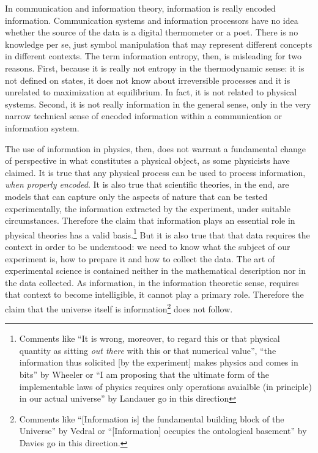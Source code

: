\documentclass[iopart]{revtex4-1}
\begin{document}
In communication and information theory, information is really encoded information. Communication systems and information processors have no idea whether the source of the data is a digital thermometer or a poet. There is no knowledge per se, just symbol manipulation that may represent different concepts in different contexts. The term information entropy, then, is misleading for two reasons. First, because it is really not entropy in the thermodynamic sense: it is not defined on states, it does not know about irreversible processes and it is unrelated to maximization at equilibrium. In fact, it is not related to physical systems. Second, it is not really information in the general sense, only in the very narrow technical sense of encoded information within a communication or information system.

The use of information in physics, then, does not warrant a fundamental change of perspective in what constitutes a physical object, as some physicists have claimed. It is true that any physical process can be used to process information, \emph{when properly encoded}. It is also true that scientific theories, in the end, are models that can capture only the aspects of nature that can be tested experimentally, the information extracted by the experiment, under suitable circumstances. Therefore the claim that information plays an essential role in physical theories has a valid basis.\footnote{Comments like ``It is wrong, moreover, to regard this or that  physical quantity as sitting \emph{out there} with this or that numerical value'', ``the information thus solicited [by the experiment] makes physics and comes in bits'' by Wheeler\cite{Wheeler} or ``I am proposing that the ultimate form of the implementable laws of physics requires only operations avaialble (in principle) in our actual universe'' by Landauer\cite{Landauer} go in this direction} But it is also true that that data requires the context in order to be understood: we need to know what the subject of our experiment is, how to prepare it and how to collect the data. The art of experimental science is contained neither in the mathematical description nor in the data collected. As information, in the information theoretic sense, requires that context to become intelligible, it cannot play a primary role. Therefore the claim that the universe itself is information\footnote{Comments like ``[Information is] the fundamental building block of the Universe'' by Vedral\cite{Vedral} or ``[Information] occupies the ontological basement'' by Davies\cite{Davies} go in this direction.} does not follow.
\end{document}
